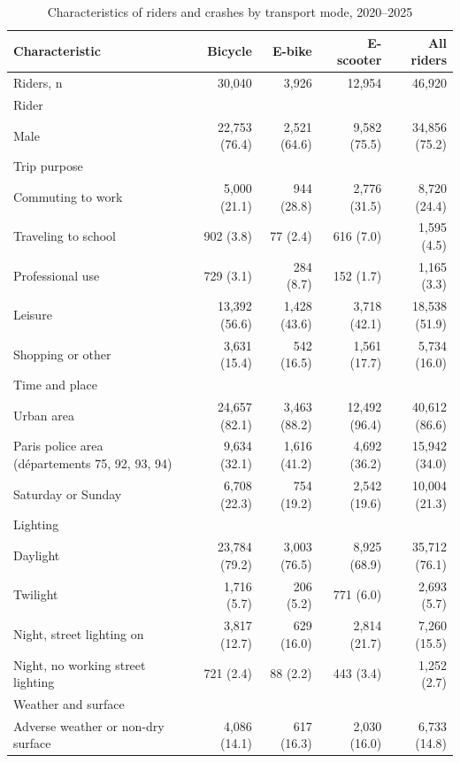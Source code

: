 \begin{table}[tp]
\centering\small
\caption{Characteristics of riders and crashes by transport mode, 2020–2025}\label{tab:table5}
\begin{threeparttable}
\begin{tabular}{lrrrr}
\toprule
Characteristic & Bicycle & E-bike & E-scooter & All riders \\
\midrule
Riders, n & 30,040 & 3,926 & 12,954 & 46,920 \\
Rider &  &  &  &  \\
\quad Male & 22,753 (76.4) & 2,521 (64.6) & 9,582 (75.5) & 34,856 (75.2) \\
Trip purpose &  &  &  &  \\
\quad Commuting to work & 5,000 (21.1) & 944 (28.8) & 2,776 (31.5) & 8,720 (24.4) \\
\quad Traveling to school & 902 (3.8) & 77 (2.4) & 616 (7.0) & 1,595 (4.5) \\
\quad Professional use & 729 (3.1) & 284 (8.7) & 152 (1.7) & 1,165 (3.3) \\
\quad Leisure & 13,392 (56.6) & 1,428 (43.6) & 3,718 (42.1) & 18,538 (51.9) \\
\quad Shopping or other & 3,631 (15.4) & 542 (16.5) & 1,561 (17.7) & 5,734 (16.0) \\
Time and place &  &  &  &  \\
\quad Urban area & 24,657 (82.1) & 3,463 (88.2) & 12,492 (96.4) & 40,612 (86.6) \\
\quad Paris police area (départements 75, 92, 93, 94) & 9,634 (32.1) & 1,616 (41.2) & 4,692 (36.2) & 15,942 (34.0) \\
\quad Saturday or Sunday & 6,708 (22.3) & 754 (19.2) & 2,542 (19.6) & 10,004 (21.3) \\
Lighting &  &  &  &  \\
\quad Daylight & 23,784 (79.2) & 3,003 (76.5) & 8,925 (68.9) & 35,712 (76.1) \\
\quad Twilight & 1,716 (5.7) & 206 (5.2) & 771 (6.0) & 2,693 (5.7) \\
\quad Night, street lighting on & 3,817 (12.7) & 629 (16.0) & 2,814 (21.7) & 7,260 (15.5) \\
\quad Night, no working street lighting & 721 (2.4) & 88 (2.2) & 443 (3.4) & 1,252 (2.7) \\
Weather and surface &  &  &  &  \\
\quad Adverse weather or non-dry surface & 4,086 (14.1) & 617 (16.3) & 2,030 (16.0) & 6,733 (14.8) \\

\end{tabular}
\end{threeparttable}
\end{table}
